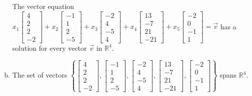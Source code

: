 \begin{exerciseAnswer}
\begin{enumerate}[(a)]
\begin{center}\begin{minipage}{0.8\textwidth}
 The vector equation \( x_{1} \left[\begin{array}{c}
4 \\
2 \\
2 \\
-2
\end{array}\right] + x_{2} \left[\begin{array}{c}
-1 \\
1 \\
2 \\
-5
\end{array}\right] + x_{3} \left[\begin{array}{c}
-2 \\
4 \\
-5 \\
4
\end{array}\right] + x_{4} \left[\begin{array}{c}
13 \\
-7 \\
21 \\
-21
\end{array}\right] + x_{5} \left[\begin{array}{c}
-2 \\
0 \\
-1 \\
1
\end{array}\right] =\vec{v}\) has a solution for every vector \(\vec{v}\) in \(\mathbb{R}^4\). 
\end{minipage}\end{center}
    
\item  The set of vectors \( \left\{ \left[\begin{array}{c}
4 \\
2 \\
2 \\
-2
\end{array}\right] , \left[\begin{array}{c}
-1 \\
1 \\
2 \\
-5
\end{array}\right] , \left[\begin{array}{c}
-2 \\
4 \\
-5 \\
4
\end{array}\right] , \left[\begin{array}{c}
13 \\
-7 \\
21 \\
-21
\end{array}\right] , \left[\begin{array}{c}
-2 \\
0 \\
-1 \\
1
\end{array}\right] \right\} \) spans \(\mathbb{R}^4\). 
\end{enumerate}
    
\end{exerciseAnswer}
    
